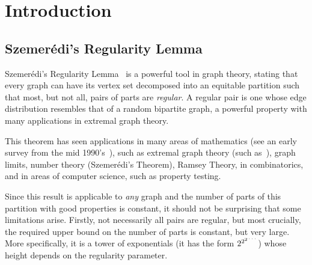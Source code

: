 \section{Introduction} \label{sec:introduction}

    \subsection{Szemer\'edi's Regularity Lemma}

    Szemer\'edi's Regularity Lemma~\cite{regular_partitions_of_graphs} is a powerful tool in graph theory,
    stating that every graph can have its vertex set decomposed into an equitable partition such that most,
    but not all, pairs of parts are \emph{regular}.
    A regular pair is one whose edge distribution resembles that of a random bipartite graph, a powerful property with
    many applications in extremal graph theory.

    This theorem has seen applications in many areas of mathematics
    (see an early survey from the mid 1990's~\cite{survey of regularity lemma}), such as extremal graph
    theory (such as~\cite{kuhn ostus, ...}), graph limits, number theory (Szemer\'edi's Theorem), Ramsey Theory,
    in combinatorics, and in areas of computer science, such as property testing.

    Since this result is applicable to \emph{any} graph and the number of parts of this partition with good properties is constant,
    it should not be surprising that some limitations arise.
    Firstly, not necessarily all pairs are regular, but most crucially, the required upper bound on the number of parts is
    constant, but very large.
    More specifically, it is a tower of exponentials (it has the form $2^{2^{2^{\text{\reflectbox{$\dots$}}}}}$)
    whose height depends on the regularity parameter.

